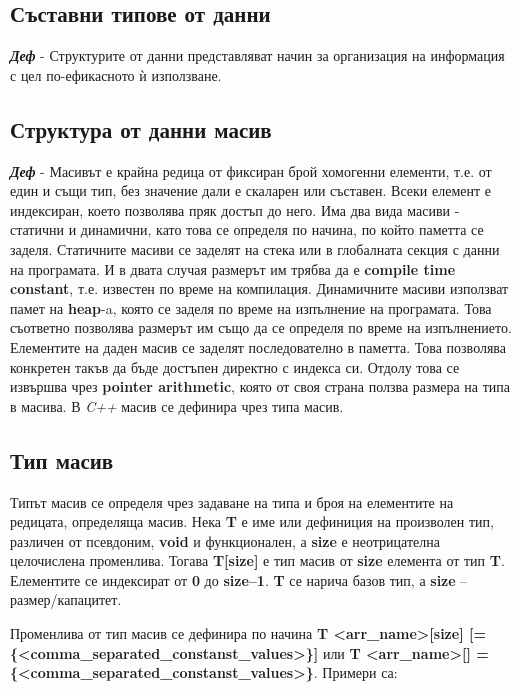 \documentclass[fleqn,12pt]{article}
\begin{document}
\subsection{Съставни типове от данни}

\noindent \textit{\textbf{Деф}} - Структурите от данни представляват начин за организация на информация с цел по-ефикасното ѝ използване.

\subsection{Структура от данни масив}

\noindent \textit{\textbf{Деф}} - Масивът е крайна редица от фиксиран брой хомогенни елементи, т.е. от един и същи тип, без значение дали е скаларен или съставен.
Всеки елемент е индексиран, което позволява пряк достъп до него.
\bigbreak
Има два вида масиви - статични и динамични, като това се определя по начина, по който паметта се заделя.
Статичните масиви се заделят на стека или в глобалната секция с данни на програмата. И в двата случая размерът им трябва да 
е \textbf{compile time constant}, т.е. известен по време на компилация.
Динамичните масиви използват памет на \textbf{heap}-a, която се заделя по време на изпълнение на програмата.
Това съответно позволява размерът им също да се определя по време на изпълнението.
\bigbreak
Елементите на даден масив се заделят последователно в паметта.
Това позволява конкретен такъв да бъде достъпен директно с индекса си.
Отдолу това се извършва чрез \textbf{pointer arithmetic}, която от своя страна ползва размера на типа в масива.
\bigbreak
В \textit{C++} масив се дефинира чрез типа масив.

\subsection{Тип масив}

Типът масив се определя чрез задаване на типа и броя на елементите на редицата, определяща масив.
Нека \textbf{T} е име или дефиниция на произволен тип, различен от псевдоним, \textbf{void} и функционален, а \textbf{size} е неотрицателна целочислена променлива.
Тогава \textbf{T[size]} е тип масив от \textbf{size} елемента от тип \textbf{T}.
Елементите се индексират от \textbf{0} до \textbf{size–1}.
\textbf{T} се нарича базов тип, а \textbf{size} – размер/капацитет.

Променлива от тип масив се дефинира по начина \textbf{T <arr\_name>[size] [= \{<comma\_separated\_constanst\_values>\}]} или \textbf{T <arr\_name>[] = \{<comma\_separated\_constanst\_values>\}}.
Примери са:
\end{document}
